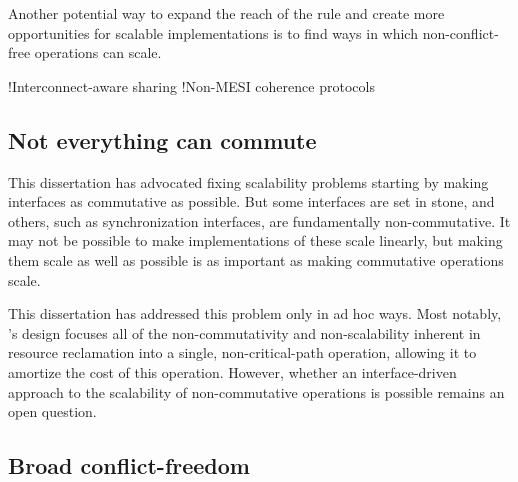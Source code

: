 
Another potential way to expand the reach of the rule and create more
opportunities for scalable implementations is to find ways in which
non-conflict-free operations can scale.

\XXX!{Interconnect-aware sharing} \XXX!{Non-MESI coherence protocols}


\subsection{Not everything can commute}

This dissertation has advocated fixing scalability problems starting
by making interfaces as commutative as possible.  But some interfaces
are set in stone, and others, such as synchronization interfaces, are
fundamentally non-commutative.  It may not be possible to make
implementations of these scale linearly, but making them scale as well
as possible is as important as making commutative operations scale.

This dissertation has addressed this problem only in ad hoc ways.
Most notably, 's design focuses all of the non-commutativity
and non-scalability inherent in resource reclamation into a single,
non-critical-path operation, allowing it to amortize the cost of this
operation.
%
However, whether an interface-driven approach to the scalability of
non-commutative operations is possible remains an open question.


\subsection{Broad conflict-freedom}



